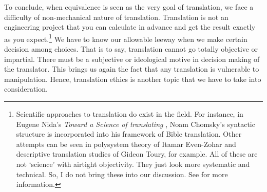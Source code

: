 To conclude, when equivalence is seen as the very goal of translation, we face a difficulty of non-mechanical nature of translation. Translation is not an engineering project that you can calculate in advance and get the result exactly as you expect.\footnote{Scientific approaches to translation do exist in the field. For instance, in Eugene Nida's \textit{Toward a Science of translating} \citealp{nida:toward}, Noam Chomsky's syntactic structure is incorporated into his framework of Bible translation. Other attempts can be seen in polysystem theory of Itamar Even-Zohar and descriptive translation studies of Gideon Toury, for example. All of these are not `science' with airtight objectivity. They just look more systematic and technical. So, I do not bring these into our discussion. See \citealp[p.~169--96]{munday:translation} for more information.} We have to know our allowable leeway when we make certain decision among choices. That is to say, translation cannot go totally objective or impartial. There must be a subjective or ideological motive in decision making of the translator. This brings us again the fact that any translation is vulnerable to manipulation. Hence, translation ethics is another topic that we have to take into consideration.
